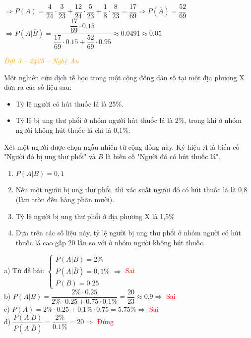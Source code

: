 \documentclass[twoside,final]{hcmut-report}
\newcommand{\exercise}[1]{\begin{exercisebox}#1\end{exercisebox}}
\begin{document}
$\Rightarrow P(A) = \dfrac{4}{24}\cdot\dfrac{3}{23} + \dfrac{12}{24}\cdot\dfrac{5}{23} + \dfrac{1}{8}\cdot\dfrac{8}{23} = \dfrac{17}{69} \Rightarrow P(\overline{A}) = \dfrac{52}{69}$\\
$\Rightarrow P(A|\overline{B}) = \dfrac{\dfrac{17}{69}\cdot 0.15}{\dfrac{17}{69}\cdot 0.15 + \dfrac{52}{69}\cdot0.95} \approx 0.0491 \approx 0.05$

\exercise{\textcolor{orange}{\textit{Đợt 3 -- 2425 -- Nghệ An}}

    Một nghiên cứu dịch tễ học trong một cộng đồng dân số tại một địa phương X đưa ra các số liệu sau:
    \begin{itemize}[itemsep=0pt, topsep=0pt, parsep=0pt,label=-]
        \item Tỷ lệ người có hút thuốc lá là 25\%.
        \item Tỷ lệ bị ung thư phổi ở nhóm người hút thuốc lá là 2\%, trong khi ở nhóm người không hút thuốc lá chỉ là 0,1\%.
    \end{itemize}

    Xét một người được chọn ngẫu nhiên từ cộng đồng này. Ký hiệu $A$ là biến cố "Người đó bị ung thư phổi" và $B$ là biến cố "Người đó có hút thuốc lá".
    \begin{enumerate}[itemsep=0pt, topsep=0pt, parsep=0pt,label=\alph*)]
        \item $P(A|B) = 0,1$
        \item Nếu một người bị ung thư phổi, thì xác suất người đó có hút thuốc lá là 0,8 (làm tròn đến hàng phần mười).
        \item Tỷ lệ người bị ung thư phổi ở địa phương X là 1,5\%
        \item Dựa trên các số liệu này, tỷ lệ người bị ung thư phổi ở nhóm người có hút thuốc lá cao gấp 20 lần so với ở nhóm người không hút thuốc.
    \end{enumerate}}
\begin{minipage}{0.55\textwidth}
    a) Từ đề bài: $\begin{cases}
            P(A|B)=2\%                \\
            P(A|\overline{B}) = 0,1\% \\
            P(B) = 0.25
        \end{cases} \Rightarrow$ \textcolor{red}{Sai}\\

    b) $P(A|B) = \dfrac{2\%\cdot 0.25}{2\%\cdot 0.25 + 0.75\cdot 0.1\%} = \dfrac{20}{23} \approx 0.9 \Rightarrow$ \textcolor{red}{Sai}\\

    c) $P(A) = 2\%\cdot 0.25 + 0.1\%\cdot 0.75 = 5.75\%\Rightarrow$ \textcolor{red}{Sai}\\

    d) $\dfrac{P(A|B)}{P(A|\overline{B})} = \dfrac{2\%}{0.1\%} = 20\Rightarrow$  \textcolor{red}{Đúng}
\end{minipage}
\end{document}
